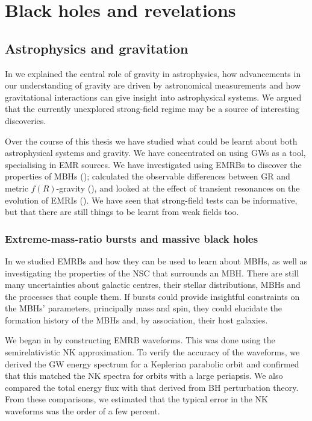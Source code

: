\chapter{Black holes and revelations}\label{ch:All-good-things}

\section{Astrophysics and gravitation}

In  we explained the central role of gravity in astrophysics, how advancements in our understanding of gravity are driven by astronomical measurements and how gravitational interactions can give insight into astrophysical systems. We argued that the currently unexplored strong-field regime may be a source of interesting discoveries.

Over the course of this thesis we have studied what could be learnt about both astrophysical systems and gravity. We have concentrated on using GWs as a tool, specialising in EMR sources. We have investigated using EMRBs to discover the properties of MBHs (); calculated the observable differences between GR and metric $f(R)$-gravity (), and looked at the effect of transient resonances on the evolution of EMRIs (). We have seen that strong-field tests can be informative, but that there are still things to be learnt from weak fields too.

\subsection{Extreme-mass-ratio bursts and massive black holes}\label{sec:Review-EMRBs}

In  we studied EMRBs and how they can be used to learn about MBHs, as well as investigating the properties of the NSC that surrounds an MBH. There are still many uncertainties about galactic centres, their stellar distributions, MBHs and the processes that couple them. If bursts could provide insightful constraints on the MBHs' parameters, principally mass and spin, they could elucidate the formation history of the MBHs and, by association, their host galaxies.

We began in  by constructing EMRB waveforms. This was done using the semirelativistic NK approximation. To verify the accuracy of the waveforms, we derived the GW energy spectrum for a Keplerian parabolic orbit and confirmed that this matched the NK spectra for orbits with a large periapsis. We also compared the total energy flux with that derived from BH perturbation theory. From these comparisons, we estimated that the typical error in the NK waveforms was the order of a few percent.

